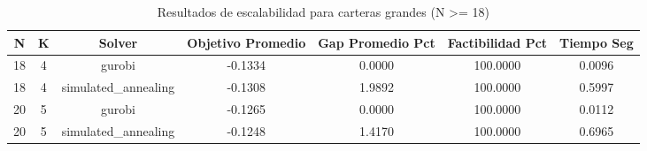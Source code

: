 \begin{table}[htbp]
  \centering
  \caption{Resultados de escalabilidad para carteras grandes (N >= 18)}
  \label{tab:escalabilidad}
  \begin{tabular}{ccccccc}
    \toprule
    N & K & Solver & Objetivo Promedio & Gap Promedio Pct & Factibilidad Pct & Tiempo Seg \\
    \midrule
    18 & 4 & gurobi & -0.1334 & 0.0000 & 100.0000 & 0.0096 \\
    18 & 4 & simulated\_annealing & -0.1308 & 1.9892 & 100.0000 & 0.5997 \\
    20 & 5 & gurobi & -0.1265 & 0.0000 & 100.0000 & 0.0112 \\
    20 & 5 & simulated\_annealing & -0.1248 & 1.4170 & 100.0000 & 0.6965 \\
    \bottomrule
  \end{tabular}
\end{table}
